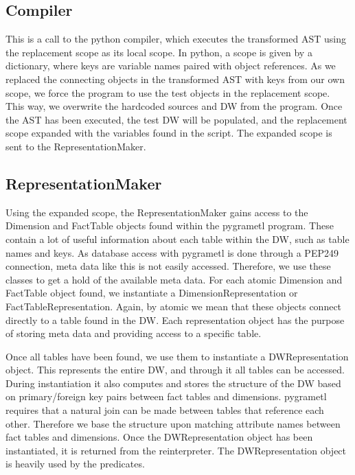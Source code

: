 \subsection{Compiler}
This is a call to the python compiler, which executes the transformed AST using the replacement scope as its local scope. In python, a scope is given by a dictionary, where keys are variable names paired with object references. As we replaced the connecting objects in the transformed AST with keys from our own scope, we force the program to use the test objects in the replacement scope. This way, we overwrite the hardcoded sources and DW from the program.  Once the AST has been executed, the test DW will be populated, and the replacement scope expanded with the variables found in the script. The expanded scope is sent to the RepresentationMaker. 

\subsection{RepresentationMaker} 
Using the expanded scope, the RepresentationMaker gains access to the Dimension and FactTable objects found within the pygrametl program. These contain a lot of useful information about each table within the DW, such as table names and keys. As database access with pygrametl is done through a PEP249 connection, meta data like this is not easily accessed. Therefore, we use these classes to get a hold of the available meta data. For each atomic Dimension and FactTable object found, we instantiate a DimensionRepresentation or FactTableRepresentation. Again, by atomic we mean that these objects connect directly to a table found in the DW. Each representation object has the purpose of storing meta data and providing access to a specific table. 

Once all tables have been found, we use them to instantiate a DWRepresentation object. This represents the entire DW, and through it all tables can be accessed. During instantiation it also computes and stores the structure of the DW based on primary/foreign key pairs between fact tables and dimensions.  pygrametl requires that a natural join can be made between tables that reference each other. Therefore we base the structure upon matching attribute names between fact tables and dimensions. Once the DWRepresentation object has been instantiated, it is returned from the reinterpreter. The DWRepresentation object is heavily used by the predicates.